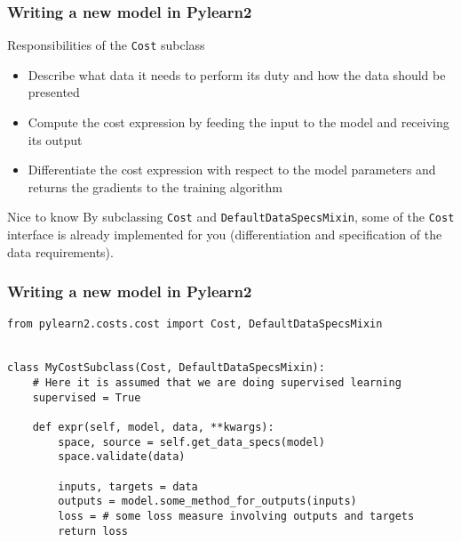 \documentclass[mathserif, xcolor=dvipsnames]{beamer}
\begin{document}
\begin{frame}[fragile]
    \frametitle{Writing a new model in Pylearn2}
    \begin{block}{Responsibilities of the \texttt{Cost} subclass}
    \begin{itemize}
        \item{Describe what data it needs to perform its duty and how the data
              should be presented}
        \item{Compute the cost expression by feeding the input to the model
              and receiving its output}
        \item{Differentiate the cost expression with respect to the model
              parameters and returns the gradients to the training algorithm}
    \end{itemize}
    \end{block}

    \begin{alertblock}{Nice to know}
    By subclassing \texttt{Cost} and \texttt{DefaultDataSpecsMixin}, some of the
    \texttt{Cost} interface is already implemented for you (differentiation
    and specification of the data requirements).
    \end{alertblock}
\end{frame}

\begin{frame}[fragile]
    \frametitle{Writing a new model in Pylearn2}
    \begin{examples}
\begin{lstlisting}[caption=Cost subclass implementation mockup]
from pylearn2.costs.cost import Cost, DefaultDataSpecsMixin


class MyCostSubclass(Cost, DefaultDataSpecsMixin):
    # Here it is assumed that we are doing supervised learning
    supervised = True

    def expr(self, model, data, **kwargs):
        space, source = self.get_data_specs(model)
        space.validate(data)

        inputs, targets = data
        outputs = model.some_method_for_outputs(inputs)
        loss = # some loss measure involving outputs and targets
        return loss
\end{lstlisting}
    \end{examples}
\end{frame}
\end{document}
